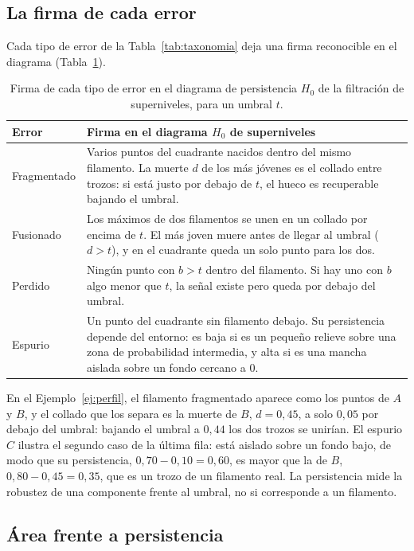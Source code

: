 \subsection{La firma de cada error}

Cada tipo de error de la Tabla~\ref{tab:taxonomia} deja una firma
reconocible en el diagrama (Tabla~\ref{tab:firmas}).

\begin{table}[ht]
\centering
\small
\begin{tabular}{@{}lp{10.5cm}@{}}
\toprule
Error & Firma en el diagrama $H_0$ de superniveles\\
\midrule
Fragmentado & Varios puntos del cuadrante nacidos dentro del mismo
filamento. La muerte $d$ de los más jóvenes es el collado entre trozos:
si está justo por debajo de $t$, el hueco es recuperable bajando el
umbral.\\
Fusionado & Los máximos de dos filamentos se unen en un collado por
encima de $t$. El más joven muere antes de llegar al umbral ($d>t$), y
en el cuadrante queda un solo punto para los dos.\\
Perdido & Ningún punto con $b>t$ dentro del filamento. Si hay uno con
$b$ algo menor que $t$, la señal existe pero queda por debajo del
umbral.\\
Espurio & Un punto del cuadrante sin filamento debajo. Su persistencia
depende del entorno: es baja si es un pequeño relieve sobre una zona de
probabilidad intermedia, y alta si es una mancha aislada sobre un fondo
cercano a $0$.\\
\bottomrule
\end{tabular}
\caption{Firma de cada tipo de error en el diagrama de persistencia $H_0$
de la filtración de superniveles, para un umbral $t$.}
\label{tab:firmas}
\end{table}

En el Ejemplo~\ref{ej:perfil}, el filamento fragmentado aparece como los
puntos de $A$ y $B$, y el collado que los separa es la muerte de $B$,
$d=0{,}45$, a solo $0{,}05$ por debajo del umbral: bajando el umbral a
$0{,}44$ los dos trozos se unirían. El espurio $C$ ilustra el segundo
caso de la última fila: está aislado sobre un fondo bajo, de modo que su
persistencia, $0{,}70-0{,}10=0{,}60$, es mayor que la de $B$,
$0{,}80-0{,}45=0{,}35$, que es un trozo de un filamento real. La
persistencia mide la robustez de una componente frente al umbral, no si
corresponde a un filamento.

\subsection{Área frente a persistencia}

